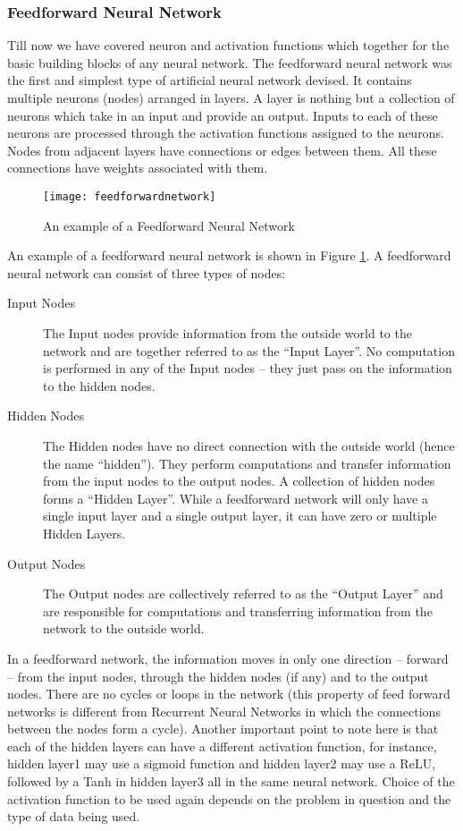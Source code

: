 \subsubsection{Feedforward Neural Network}
Till now we have covered neuron and activation functions which together for the basic building blocks of any neural network. The feedforward
neural network was the first and simplest type of artificial neural network devised. It contains multiple neurons (nodes) arranged in layers.
A layer is nothing but a collection of neurons which take in an input and provide an output. Inputs to each of these neurons are processed
through the activation functions assigned to the neurons. Nodes from adjacent layers have connections or edges between them. All these connections have weights associated with them.
\begin{figure}[h]
  \centering
  \texttt{[image: feedforwardnetwork]}
  \caption{An example of a Feedforward Neural Network}
  \label{fig:feedforwardnetwork}
\end{figure}
An example of a feedforward neural network is shown in Figure \ref{fig:feedforwardnetwork}. A feedforward neural network can consist of three types of nodes:
\begin{description}
\item[ Input Nodes ] The Input nodes provide information from the outside world to the network and are together referred to as the
  “Input Layer”. No computation is performed in any of the Input nodes – they just pass on the information to the hidden nodes.
\item[  Hidden Nodes ]  The Hidden nodes have no direct connection with the outside world (hence the name “hidden”). They perform
  computations and transfer information from the input nodes to the output nodes. A collection of hidden nodes forms a “Hidden Layer”.
  While a feedforward network will only have a single input layer and a single output layer, it can have zero or multiple Hidden Layers.
\item [ Output Nodes ] The Output nodes are collectively referred to as the “Output Layer” and are responsible for computations and
  transferring information from the network to the outside world.
\end{description}

In a feedforward network, the information moves in only one direction – forward – from the input nodes, through the hidden nodes (if any)
and to the output nodes. There are no cycles or loops in the network (this property of feed forward networks is different from Recurrent
Neural Networks in which the connections between the nodes form a cycle). Another important point to note here is that each of the hidden
layers can have a different activation function, for instance, hidden layer1 may use a sigmoid function and hidden layer2 may use a ReLU,
followed by a Tanh in hidden layer3 all in the same neural network. Choice of the activation function to be used again depends on the
problem in question and the type of data being used.

